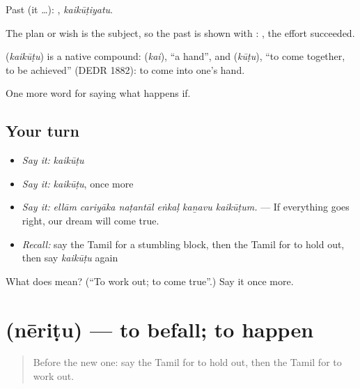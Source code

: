 Past (it …): , \emph{kaikūṭiyatu}.

The plan or wish is the subject, so the past is shown with :  , the effort succeeded.

\begin{cousinweb}
\textbf{} (\emph{kaikūṭu}) is a native compound:  (\emph{kai}), \textquotedblleft{}a hand\textquotedblright{}, and  (\emph{kūṭu}), \textquotedblleft{}to come together, to be achieved\textquotedblright{} (DEDR 1882): to come into one's hand.
\end{cousinweb}

\begin{grammarlens}[title={What you've built}]
One more word for saying what happens if.
\end{grammarlens}

\subsection*{Your turn}
\begin{itemize}
\raggedright
  \item \emph{Say it:} \emph{kaikūṭu}
  \item \emph{Say it:} \emph{kaikūṭu}, once more
  \item \emph{Say it:} \emph{ellām cariyāka naṭantāl eṅkaḷ kaṉavu kaikūṭum.} — If everything goes right, our dream will come true.
  \item \emph{Recall:} say the Tamil for a stumbling block, then the Tamil for to hold out, then say \emph{kaikūṭu} again
\end{itemize}

\begin{tcolorbox}[breakable,colback=teal!4,colframe=teal!35!black,title={Before you move on}]
What does  mean? (\textquotedblleft{}To work out; to come true\textquotedblright{}.) Say it once more.
\end{tcolorbox}
\section[\texorpdfstring{\ta{நேரிடு} (nēriṭu)}{நேரிடு (nēriṭu)}]{ (nēriṭu) — to befall; to happen}

\label{lesson:TA-C547-neritu}



\begin{quote}
Before the new one: say the Tamil for to hold out, then the Tamil for to work out.
\end{quote}

